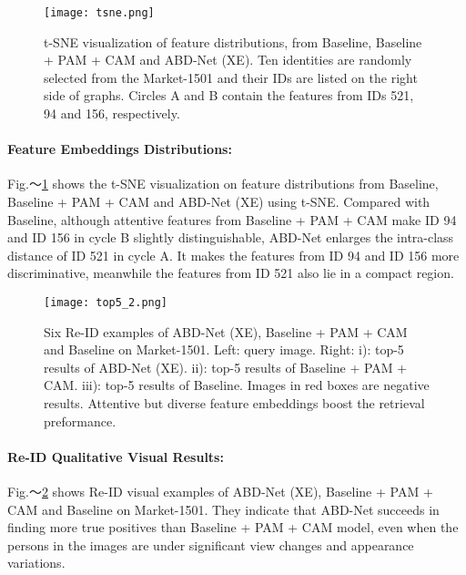 \documentclass[10pt,twocolumn]{article}
\begin{document}
\begin{figure}[t]
\begin{center}
   \texttt{[image: tsne.png]}
\end{center}
   \caption{t-SNE visualization of feature distributions, from Baseline, Baseline + PAM + CAM and ABD-Net (XE). Ten identities are randomly selected from the Market-1501 and their IDs are listed on the right side of graphs. Circles A and B contain the features from IDs 521, 94 and 156, respectively.}
\label{fig:tsne}
\vspace{-1mm}
\end{figure}

\paragraph{Feature Embeddings Distributions:} Fig.～\ref{fig:tsne} shows the t-SNE visualization on feature distributions from Baseline, Baseline + PAM + CAM and ABD-Net (XE) using t-SNE. Compared with Baseline, although attentive features from Baseline + PAM + CAM make ID 94 and ID 156 in cycle B slightly distinguishable, ABD-Net enlarges the intra-class distance of ID 521 in cycle A. It makes the features from ID 94 and ID 156 more discriminative, meanwhile the features from ID 521 also lie in a compact region.

\begin{figure}[t]
\begin{center}
   \texttt{[image: top5\_2.png]}
\end{center}
   \caption{Six Re-ID examples of ABD-Net (XE), Baseline + PAM + CAM and Baseline on Market-1501. Left: query image. Right: i): top-5 results of ABD-Net (XE). ii): top-5 results of Baseline + PAM + CAM. iii): top-5 results of Baseline. Images in red boxes are negative results. Attentive but diverse feature embeddings boost the retrieval preformance.}
\label{fig:top5}
\vspace{-1mm}
\end{figure}

\paragraph{Re-ID Qualitative Visual Results:} Fig.～\ref{fig:top5} shows Re-ID visual examples of ABD-Net (XE), Baseline + PAM + CAM and Baseline on Market-1501. They indicate that ABD-Net succeeds in finding more true positives than Baseline + PAM + CAM model, even when the persons in the images are under significant view changes and appearance variations. 
\end{document}
